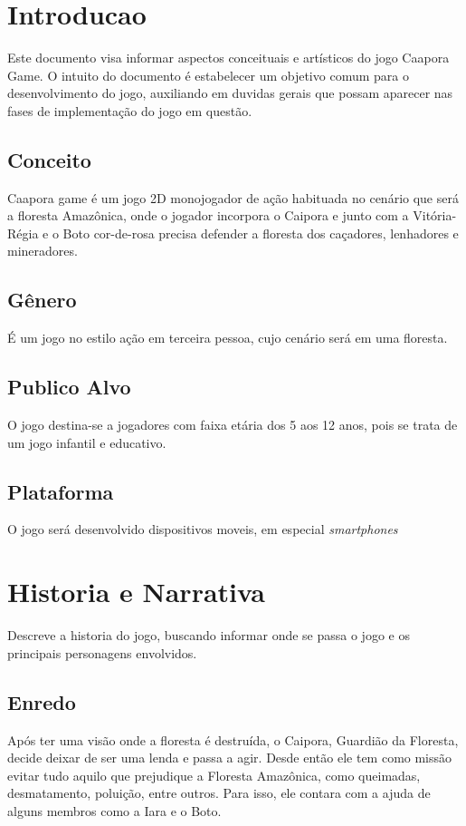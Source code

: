 \label{ap:game-design-document}


\section {Introducao}
\label{ap:introducao}

Este documento visa informar aspectos conceituais e artísticos do jogo Caapora Game. O intuito do documento é estabelecer um objetivo comum para o desenvolvimento do jogo, auxiliando em duvidas gerais que possam aparecer nas fases de implementação do jogo em questão.

\subsection {Conceito}

Caapora game é um jogo 2D monojogador de ação habituada no cenário que será a floresta Amazônica, onde o jogador incorpora o Caipora e junto com a Vitória-Régia e o Boto cor-de-rosa precisa defender a floresta dos caçadores, lenhadores e mineradores.

\subsection {Gênero}
É um jogo no estilo ação em terceira pessoa, cujo cenário será em uma floresta.

\subsection {Publico Alvo}
O jogo destina-se a jogadores com faixa etária dos 5 aos 12 anos, pois se trata de um jogo infantil e educativo.

\subsection {Plataforma}
O jogo será desenvolvido dispositivos moveis, em especial \textit {smartphones}

\section {Historia e Narrativa}
\label{ap:historia-e-narrativa}

Descreve a historia do jogo, buscando informar onde se passa o jogo e os principais personagens envolvidos.

\subsection{Enredo}
Após ter uma visão onde a floresta é destruída, o Caipora, Guardião da Floresta, decide deixar de ser uma lenda e passa a agir. Desde então ele tem como missão evitar tudo aquilo que prejudique a Floresta Amazônica, como queimadas, desmatamento, poluição, entre outros. Para isso, ele contara com a ajuda de alguns membros como a Iara e o Boto.

